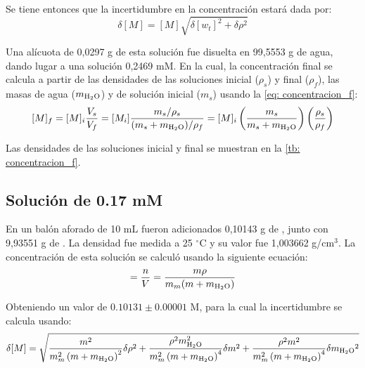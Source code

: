 		Se tiene entonces que la incertidumbre en la concentraci\'on estar\'a dada por:
		\begin{equation}
			\delta [M] = [M]\sqrt{\delta[w_t]^2 + \delta\rho^2} 
		\end{equation}
		
		Una al\'icuota de 0,0297 g de esta soluci\'on fue disuelta en 99,5553 g de agua, dando lugar a una soluci\'on 0,2469 mM. En la cual, la concentraci\'on final se calcula a partir de las densidades de las soluciones inicial ($\rho_s$) y final ($\rho_f$), las masas de agua ($m_\text{\ce{H2O}}$) y de soluci\'on inicial ($m_s$) usando la \autoref{eq: concentracion_f}:
		\begin{equation}\label{eq: concentracion_f}
			[M]_f = [M]_i\dfrac{V_s}{V_f} = [M_i]\dfrac{m_s/\rho_s}{(m_s + m_{\text{\ce{H2O}}})/\rho_f} =  [M]_i\left(\dfrac{m_s}{m_s + m_{\text{\ce{H2O}}}}\right)\left(\dfrac{\rho_s}{\rho_f}\right)
		\end{equation}
		
		Las densidades de las soluciones inicial y final se muestran en la \autoref{tb: concentracion_f}.
		
	\subsection{Soluci\'on de  0.17 mM}
	En un bal\'on aforado de 10 mL fueron adicionados 0,10143 g de , junto con 9,93551 g de . La densidad fue medida a 25 $^\circ$C y su valor fue 1,003662 g/cm$^3$. La concentraci\'on de esta soluci\'on se calcul\'o usando la siguiente ecuaci\'on:
	\begin{equation}
		[M] = \dfrac{n}{V} = \dfrac{m\rho}{m_m(m + m_{\ce{H2O}})}
	\end{equation}

	Obteniendo un valor de $0.10131\pm 0.00001$ M, para la cual la incertidumbre se calcula usando:
	\small
	\begin{equation}
		\delta[M] = \sqrt{\frac{m^{2}}{m_m^{2} \left(m + m_{\text{\ce{H2O}}}\right)^{2}}\delta\rho^{2} + \frac{\rho^{2} m_{\text{\ce{H2O}}}^{2}}{m_m^{2} \left(m + m_{\text{\ce{H2O}}}\right)^{4}}\delta m^{2} + \frac{\rho^{2} m^{2}}{m_m^{2} \left(m + m_{\text{\ce{H2O}}}\right)^{4}}\delta{m_{\text{\ce{H2O}}}}^{2}}
	\end{equation}
	\normalsize
	
